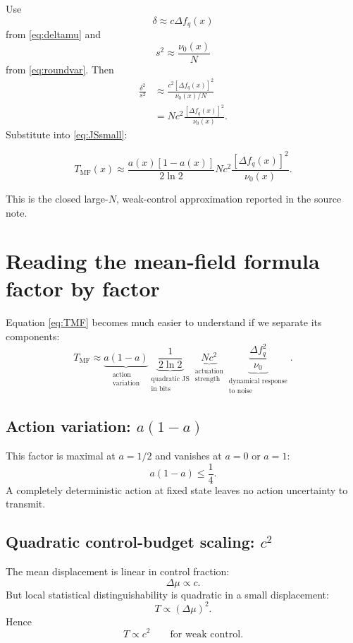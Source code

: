 \documentclass[11pt,a4paper]{article}
\newcommand{\1}{\mathbbm{1}}
\begin{document}
Use
\[
\delta\approx c\Delta f_q(x)
\]
from \cref{eq:deltamu} and
\[
s^2\approx\frac{\nu_0(x)}{N}
\]
from \cref{eq:roundvar}. Then
\begin{align}
\frac{\delta^2}{s^2}
&\approx
\frac{c^2[\Delta f_q(x)]^2}{\nu_0(x)/N}\\
&=Nc^2\frac{[\Delta f_q(x)]^2}{\nu_0(x)}.
\end{align}
Substitute into \cref{eq:JSsmall}:
\begin{resultbox}
\begin{equation}
\boxed{
T_{\mathrm{MF}}(x)
\approx
\frac{a(x)[1-a(x)]}{2\ln2}
Nc^2
\frac{[\Delta f_q(x)]^2}{\nu_0(x)}.}
\label{eq:TMF}
\end{equation}
\end{resultbox}

This is the closed large-$N$, weak-control approximation reported in the source note.

\section{Reading the mean-field formula factor by factor}

Equation \cref{eq:TMF} becomes much easier to understand if we separate its components:
\[
T_{\mathrm{MF}}
\approx
\underbrace{a(1-a)}_{\substack{\text{action}\\\text{variation}}}
\underbrace{\frac1{2\ln2}}_{\substack{\text{quadratic JS}\\\text{in bits}}}
\underbrace{Nc^2}_{\substack{\text{actuation}\\\text{strength}}}
\underbrace{\frac{\Delta f_q^2}{\nu_0}}_{\substack{\text{dynamical response}\\\text{to noise}}}.
\]

\subsection{Action variation: $a(1-a)$}

This factor is maximal at $a=1/2$ and vanishes at $a=0$ or $a=1$:
\[
a(1-a)\le\frac14.
\]
A completely deterministic action at fixed state leaves no action uncertainty to transmit.

\subsection{Quadratic control-budget scaling: $c^2$}

The mean displacement is linear in control fraction:
\[
\Delta\mu\propto c.
\]
But local statistical distinguishability is quadratic in a small displacement:
\[
T\propto(\Delta\mu)^2.
\]
Hence
\[
\boxed{T\propto c^2\qquad\text{for weak control}.}
\]
\end{document}
